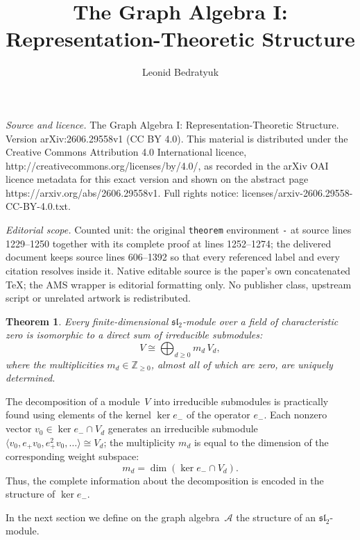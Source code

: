 \documentclass[10pt,a4paper]{amsart}
\newtheorem{theorem}{Theorem}[section]
\begin{document}
\title[The Graph Algebra I: Representation-Theoretic Structure]{The Graph Algebra I: Representation-Theoretic Structure}
\author{Leonid Bedratyuk}
\date{}
\maketitle
\noindent\emph{Source and licence.} The Graph Algebra I: Representation-Theoretic Structure. Version arXiv:2606.29558v1 (CC BY 4.0). This material is distributed under the Creative Commons Attribution 4.0 International licence, http://creativecommons.org/licenses/by/4.0/, as recorded in the arXiv OAI licence metadata for this exact version and shown on the abstract page https://arxiv.org/abs/2606.29558v1. Full rights notice: licenses/arxiv-2606.29558-CC-BY-4.0.txt.\par\smallskip
\noindent\textit{Editorial scope.} Counted unit: the original \texttt{theorem} environment \texttt{-} at source lines 1229--1250 together with its complete proof at lines 1252--1274; the delivered document keeps source lines 606--1392 so that every referenced label and every citation resolves inside it. Native editable source is the paper's own concatenated TeX; the AMS wrapper is editorial formatting only. No publisher class, upstream script or unrelated artwork is redistributed.
\begin{theorem}\label{complete_reducibility_sl2}
  Every finite-dimensional $\mathfrak{sl}_2$-module over a field of
  characteristic zero is isomorphic to a direct sum of irreducible
  submodules:
  $$
    V \cong \bigoplus_{d \ge 0} m_d\, V_d,
  $$
  where the multiplicities $m_d \in \mathbb{Z}_{\ge 0}$, almost all of which
  are zero, are uniquely determined.
\end{theorem}

\medskip
The decomposition of a module~$V$ into irreducible submodules is practically
found using elements of the kernel $\ker e_-$ of the operator $e_-$.
Each nonzero vector $v_0 \in \ker e_- \cap V_{d}$ generates an irreducible
submodule
$\langle v_0, e_+v_0, e_+^2v_0, \dots \rangle \cong V_d$;
the multiplicity $m_d$ is equal to the dimension of the corresponding weight
subspace:
$$
  m_d = \dim(\ker e_- \cap V_{d}).
$$
Thus, the complete information about the decomposition is encoded in the
structure of $\ker e_-$.

\medskip

In the next section we define on the graph algebra~$\mathcal{A}$ the
structure of an $\mathfrak{sl}_2$-module.
\end{document}
